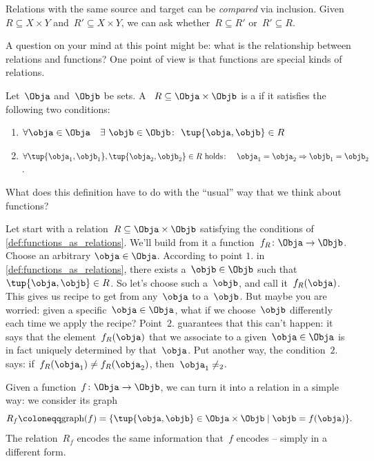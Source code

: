 \begin{remark}
    Relations with the same source and target can be \emph{compared} via inclusion. Given~$R\subseteq X\times Y$ and~$R'\subseteq X\times Y$, we can ask whether~$R\subseteq R'$ or~$R'\subseteq R$.
\end{remark}
A question on your mind at this point might be: what is the relationship between relations and functions? One point of view is that functions are special kinds of relations.

\begin{definition}\label{def:functions_as_relations}
    Let~$\Obja$ and~$\Objb$ be sets. A ~$R \subseteq \Obja \times \Objb$ is a \textbf{} if it satisfies the following two conditions:
    \begin{enumerate}
        \item $\forall \obja \in \Obja \quad \exists \ \objb \in \Objb\colon  \ \tup{\obja,\objb} \in R$
        \item $\forall \tup{\obja_1, \objb_1}, \tup{\obja_2, \objb_2} \in R  \text{ holds}\colon \quad \obja_1 = \obja_2 \Rightarrow \objb_1 = \objb_2$.
    \end{enumerate}
\end{definition}

What does this definition have to do with the ``usual'' way that we think about functions?

Let start with a relation~$R \subseteq \Obja \times \Objb$ satisfying the conditions of \cref{def:functions_as_relations}. We'll build from it a function~$f_R \colon \Obja \to \Objb$. Choose an arbitrary $\obja \in \Obja$. According to point $1.$ in \cref{def:functions_as_relations}, there exists a~$\objb \in \Objb$ such that~$\tup{\obja,\objb} \in R$. So let's choose such a~$\objb$, and call it~$f_R(\obja)$. This gives us recipe to get from any~$\obja$ to a~$\objb$. But maybe you are worried: given a specific~$\obja \in \Obja$, what if we choose~$\objb$ differently each time we apply the recipe? Point~$2.$ guarantees that this can't happen: it says that the element~$f_R(\obja)$ that we associate to a given~$\obja \in \Obja$ is in fact uniquely determined by that~$\obja$. Put another way, the condition~$2.$ says: if~$f_R(\obja_1) \neq f_R(\obja_2)$, then~$\obja_1 \neq _2$.

Given a function~$f \colon \Obja \rightarrow \Objb$, we can turn it into a relation in a simple way: we consider its graph
\begin{equation*}
    R_f \coloneqq \text{graph}(f) = \{ \tup{\obja,\objb} \in \Obja \times \Objb \mid \objb= f(\obja) \}.
\end{equation*}
The relation~$R_f$ encodes the same information that~$f$ encodes -- simply in a different form.

